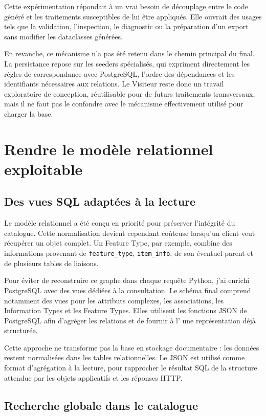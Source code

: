 Cette expérimentation répondait à un vrai besoin de découplage entre le code généré et les traitements susceptibles de lui être appliqués. Elle ouvrait des usages tels que la validation, l'inspection, le diagnostic ou la préparation d'un export sans modifier les dataclasses générées.

En revanche, ce mécanisme n'a pas été retenu dans le chemin principal du  final. La persistance repose sur les seeders spécialisés, qui expriment directement les règles de correspondance avec PostgreSQL, l'ordre des dépendances et les identifiants nécessaires aux relations. Le Visiteur reste donc un travail exploratoire de conception, réutilisable pour de futurs traitements transversaux, mais il ne faut pas le confondre avec le mécanisme effectivement utilisé pour charger la base.

\section{Rendre le modèle relationnel exploitable}

\subsection{Des vues SQL adaptées à la lecture}

Le modèle relationnel a été conçu en priorité pour préserver l'intégrité du catalogue. Cette normalisation devient cependant coûteuse lorsqu'un client veut récupérer un objet complet. Un Feature Type, par exemple, combine des informations provenant de \texttt{feature\_type}, \texttt{item\_info}, de son éventuel parent et de plusieurs tables de liaisons.

Pour éviter de reconstruire ce graphe dans chaque requête Python, j'ai enrichi PostgreSQL avec des vues dédiées à la consultation. Le schéma final comprend notamment des vues pour les attributs complexes, les associations, les Information Types et les Feature Types. Elles utilisent les fonctions JSON de PostgreSQL afin d'agréger les relations et de fournir à l' une représentation déjà structurée.

Cette approche ne transforme pas la base en stockage documentaire : les données restent normalisées dans les tables relationnelles. Le JSON est utilisé comme format d'agrégation à la lecture, pour rapprocher le résultat SQL de la structure attendue par les objets applicatifs et les réponses HTTP.

\subsection{Recherche globale dans le catalogue}

